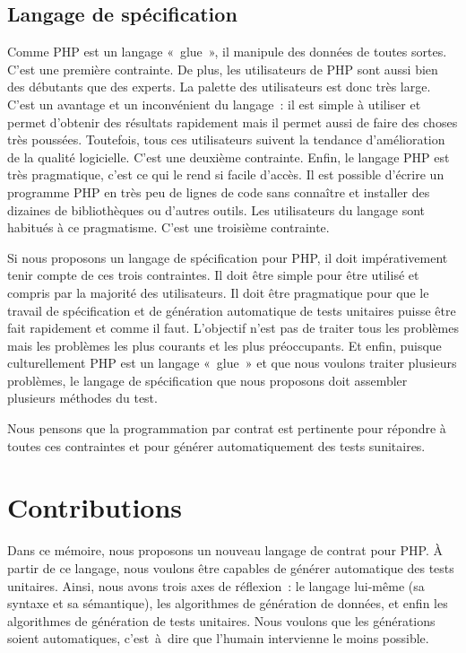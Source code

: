 \subsection{Langage de spécification}

Comme PHP est un langage «~glue~», il manipule des données de toutes sortes.
C'est une première contrainte. De plus, les utilisateurs de PHP sont aussi bien
des débutants que des experts. La palette des utilisateurs est donc très large.
C'est un avantage et un inconvénient du langage~: il est simple à utiliser et
permet d'obtenir des résultats rapidement mais il permet aussi de faire des
choses très poussées. Toutefois, tous ces utilisateurs suivent la tendance
d'amélioration de la qualité logicielle. C'est une deuxième contrainte. Enfin,
le langage PHP est très pragmatique, c'est ce qui le rend si facile d'accès. Il
est possible d'écrire un programme PHP en très peu de lignes de code sans
connaître et installer des dizaines de bibliothèques ou d'autres outils. Les
utilisateurs du langage sont habitués à ce pragmatisme. C'est une troisième
contrainte.

Si nous proposons un langage de spécification pour PHP, il doit impérativement
tenir compte de ces trois contraintes. Il doit être simple pour être utilisé et
compris par la majorité des utilisateurs. Il doit être pragmatique pour que le
travail de spécification et de génération automatique de tests unitaires puisse
être fait rapidement et comme il faut. L'objectif n'est pas de traiter tous les
problèmes mais les problèmes les plus courants et les plus préoccupants. Et
enfin, puisque culturellement PHP est un langage «~glue~» et que nous voulons
traiter plusieurs problèmes, le langage de spécification que nous proposons doit
assembler plusieurs méthodes du test.

Nous pensons que la programmation par contrat est pertinente pour répondre à
toutes ces contraintes et pour générer automatiquement des tests sunitaires.

\section{Contributions}
\label{section:introduction:contributions}

Dans ce mémoire, nous proposons un nouveau langage de contrat pour PHP. À partir
de ce langage, nous voulons être capables de générer automatique des tests
unitaires. Ainsi, nous avons trois axes de réflexion~: le langage lui-même (sa
syntaxe et sa sémantique), les algorithmes de génération de données, et enfin
les algorithmes de génération de tests unitaires. Nous voulons que les
générations soient automatiques, c'est~à~dire que l'humain intervienne le moins
possible.

